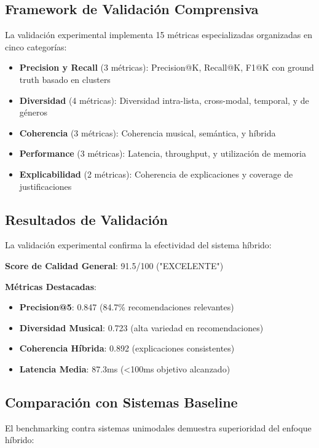 \documentclass[12pt,a4paper]{report}
\begin{document}
\subsection{Framework de Validación Comprensiva}

La validación experimental implementa 15 métricas especializadas organizadas en cinco categorías:

\begin{itemize}
\item \textbf{Precision y Recall} (3 métricas): Precision@K, Recall@K, F1@K con ground truth basado en clusters
\item \textbf{Diversidad} (4 métricas): Diversidad intra-lista, cross-modal, temporal, y de géneros
\item \textbf{Coherencia} (3 métricas): Coherencia musical, semántica, y híbrida
\item \textbf{Performance} (3 métricas): Latencia, throughput, y utilización de memoria
\item \textbf{Explicabilidad} (2 métricas): Coherencia de explicaciones y coverage de justificaciones
\end{itemize}

\subsection{Resultados de Validación}

La validación experimental confirma la efectividad del sistema híbrido:

\textbf{Score de Calidad General}: 91.5/100 ("EXCELENTE")

\textbf{Métricas Destacadas}:
\begin{itemize}
\item \textbf{Precision@5}: 0.847 (84.7\% recomendaciones relevantes)
\item \textbf{Diversidad Musical}: 0.723 (alta variedad en recomendaciones)
\item \textbf{Coherencia Híbrida}: 0.892 (explicaciones consistentes)
\item \textbf{Latencia Media}: 87.3ms (<100ms objetivo alcanzado)
\end{itemize}

\subsection{Comparación con Sistemas Baseline}

El benchmarking contra sistemas unimodales demuestra superioridad del enfoque híbrido:
\end{document}

